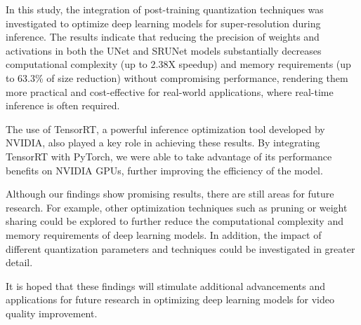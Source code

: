 \label{chap:Conclusions}

In this study, the integration of post-training quantization techniques was investigated to optimize deep learning models for super-resolution during inference. The results indicate that reducing the precision of weights and activations in both the UNet and SRUNet models substantially decreases computational complexity (up to 2.38X speedup) and memory requirements (up to 63.3\% of size reduction) without compromising performance, rendering them more practical and cost-effective for real-world applications, where real-time inference is often required.

The use of TensorRT, a powerful inference optimization tool developed by NVIDIA, also played a key role in achieving these results. By integrating TensorRT with PyTorch, we were able to take advantage of its performance benefits on NVIDIA GPUs, further improving the efficiency of the model.

Although our findings show promising results, there are still areas for future research. For example, other optimization techniques such as pruning or weight sharing could be explored to further reduce the computational complexity and memory requirements of deep learning models. In addition, the impact of different quantization parameters and techniques could be investigated in greater detail.

It is hoped that these findings will stimulate additional advancements and applications for future research in optimizing deep learning models for video quality improvement.
